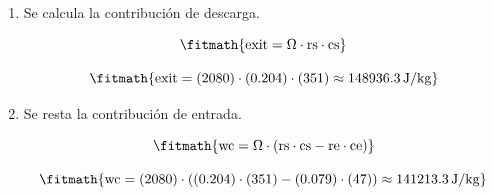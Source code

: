 \begin{enumerate}

\item Se calcula la contribución de descarga.

\[\fitmath{\mathrm{exit}=\Omega\cdot \mathrm{rs}\cdot \mathrm{cs}}\]

\[\fitmath{\mathrm{exit}=(2080)\cdot (0.204)\cdot (351)\approx 148936.3\,\mathrm{J/kg}}\]

\item Se resta la contribución de entrada.

\[\fitmath{\mathrm{wc}=\Omega\cdot \left(\mathrm{rs}\cdot \mathrm{cs}-\mathrm{re}\cdot \mathrm{ce}\right)}\]

\[\fitmath{\mathrm{wc}=(2080)\cdot \left((0.204)\cdot (351)-(0.079)\cdot (47)\right)\approx 141213.3\,\mathrm{J/kg}}\]

\end{enumerate}
